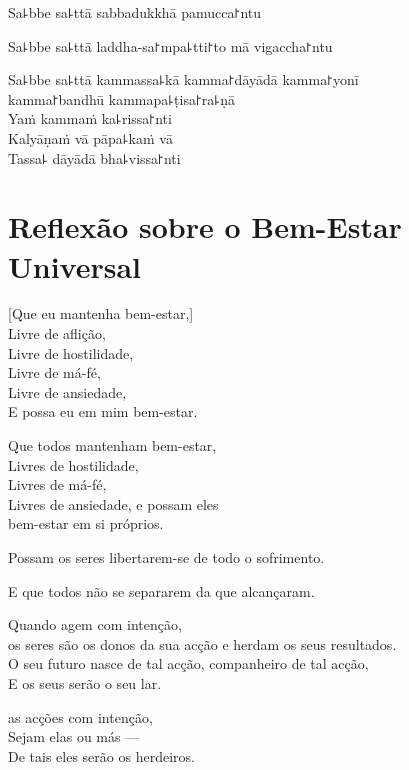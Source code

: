 Sa꜕bbe sa꜕ttā sabbadukkhā pamucca꜓ntu

Sa꜕bbe sa꜕ttā laddha-sa꜓mpa꜕tti꜓to mā vigaccha꜓ntu

Sa꜕bbe sa꜕ttā kammassa꜕kā kamma꜓dāyādā kamma꜓yonī\\
\vin kamma꜓bandhū kammapa꜕ṭisa꜓ra꜕ṇā\\
Yaṁ kammaṁ ka꜕rissa꜓nti\\
Kalyāṇaṁ vā pāpa꜕kaṁ vā\\
Tassa꜕ dāyādā bha꜕vissa꜓nti

\chapter[Bem-Estar Universal]{Reflexão sobre o Bem-Estar Universal}


\begin{leader}
\end{leader}

[Que eu mantenha bem-estar,]\\
Livre de aflição,\\
Livre de hostilidade,\\
Livre de má-fé,\\
Livre de ansiedade,\\
E possa eu  em mim bem-estar.

Que todos mantenham bem-estar,\\
Livres de hostilidade,\\
Livres de má-fé,\\
Livres de ansiedade, e possam eles\\
 bem-estar em si próprios.

Possam  os seres libertarem-se de todo o sofrimento.

E que todos não se separarem da  que alcançaram.

Quando agem com intenção,\\
 os seres são os donos da sua acção e herdam os seus resultados.\\
O seu futuro nasce de tal acção, companheiro de tal acção,\\
E os seus  serão o seu lar.

 as acções com intenção,\\
Sejam elas  ou más ---\\
De tais  eles serão os herdeiros.

